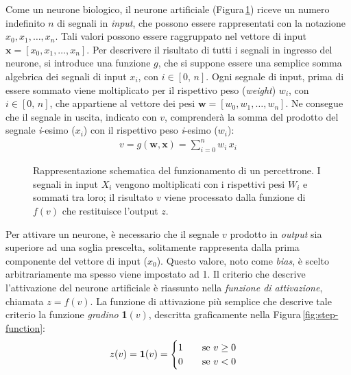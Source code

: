 Come un neurone biologico, il neurone artificiale (Figura\,\ref{fig:artificial-neuron}) riceve un numero indefinito $n$ di segnali in \textsl{input}, che possono essere rappresentati con la notazione $x_0, x_1, \dots, x_n$. Tali valori possono essere raggruppato nel vettore di input $\mathbf{x} = \left[x_0, x_1, \dots, x_n\right]$. Per descrivere il risultato di tutti i segnali in ingresso del neurone, si introduce una funzione $g$, che si suppone essere una semplice somma algebrica dei segnali di input $x_i$, con $i\in[0,\,n]$. Ogni segnale di input, prima di essere sommato viene moltiplicato per il rispettivo peso (\textit{weight}) $w_i$, con $i\in[0,\,n]$, che appartiene al vettore dei pesi $\mathbf{w} = \left[w_0, w_1, \dots, w_n \right]$. Ne consegue che il segnale in uscita, indicato con $v$, comprenderà la somma del prodotto del segnale \textit{i}-esimo ($x_i$) con il rispettivo peso \textit{i}-esimo ($w_i$):
% 
\begin{gather*}
    v = g\left(\mathbf{w}, \mathbf{x}\right) = \sum_{i = 0}^n w_i\,x_i
\end{gather*}
% 
\begin{figure}[!b]
    \centering
    
    \caption[Rappresentazione schematica del funzionamento di un percettrone.]{Rappresentazione schematica del funzionamento di un percettrone. I segnali in input $X_i$ vengono moltiplicati con i rispettivi pesi $W_i$ e sommati tra loro; il risultato $v$ viene processato dalla funzione di $f(v)$ che restituisce l'output $z$.}\label{fig:artificial-neuron}
\end{figure}
% 
\noindent Per attivare un neurone, è necessario che il segnale $v$ prodotto in \textsl{output} sia superiore ad una soglia prescelta, solitamente rappresenta dalla prima componente del vettore di input ($x_0$). Questo valore, noto come \textit{bias}, è scelto arbitrariamente ma spesso viene impostato ad 1. Il criterio che descrive l'attivazione del neurone artificiale è riassunto nella \textsl{funzione di attivazione}, chiamata $z = f(v)$. La funzione di attivazione più semplice che descrive tale criterio la funzione \textsl{gradino} \textbf{1}$(v)$, descritta graficamente nella Figura\,\ref{fig:step-function}:
% 
\begin{gather*}
    z(v) = \text{\textbf{1}}(v) =
    \begin{cases}
        1 \hspace{20px} \text{se } v\geq0\\
        0 \hspace{20px} \text{se } v<0
    \end{cases}
\end{gather*}

